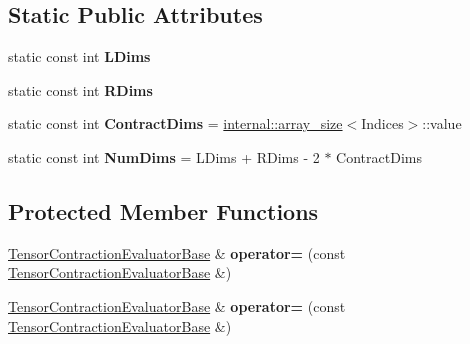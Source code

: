 \subsection*{Static Public Attributes}
\begin{DoxyCompactItemize}
\item 
static const int {\bfseries L\+Dims}
\item 
static const int {\bfseries R\+Dims}
\item 
\mbox{\label{struct_eigen_1_1_tensor_contraction_evaluator_base_aacbd2b91f62c767296e8020478807f27}} 
static const int {\bfseries Contract\+Dims} = \hyperlink{struct_eigen_1_1internal_1_1array__size}{internal\+::array\+\_\+size}$<$Indices$>$\+::value
\item 
\mbox{\label{struct_eigen_1_1_tensor_contraction_evaluator_base_a8f5be3cf2f40fe66b52a16135a9102ea}} 
static const int {\bfseries Num\+Dims} = L\+Dims + R\+Dims -\/ 2 $\ast$ Contract\+Dims
\end{DoxyCompactItemize}
\subsection*{Protected Member Functions}
\begin{DoxyCompactItemize}
\item 
\mbox{\label{struct_eigen_1_1_tensor_contraction_evaluator_base_acb95d9b319da832c872e050f555be882}} 
\hyperlink{struct_eigen_1_1_tensor_contraction_evaluator_base}{Tensor\+Contraction\+Evaluator\+Base} \& {\bfseries operator=} (const \hyperlink{struct_eigen_1_1_tensor_contraction_evaluator_base}{Tensor\+Contraction\+Evaluator\+Base} \&)
\item 
\mbox{\label{struct_eigen_1_1_tensor_contraction_evaluator_base_acb95d9b319da832c872e050f555be882}} 
\hyperlink{struct_eigen_1_1_tensor_contraction_evaluator_base}{Tensor\+Contraction\+Evaluator\+Base} \& {\bfseries operator=} (const \hyperlink{struct_eigen_1_1_tensor_contraction_evaluator_base}{Tensor\+Contraction\+Evaluator\+Base} \&)
\end{DoxyCompactItemize}
